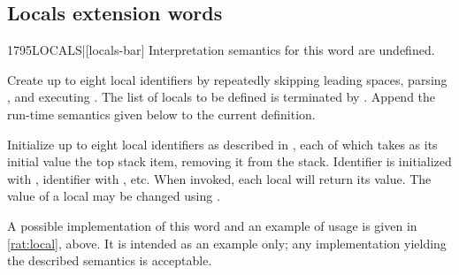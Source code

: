 \subsection{Locals extension words} %
\extended

\begin{worddef}[LOCALS]{1795}{LOCALS|}[locals-bar]
\interpret
	Interpretation semantics for this word are undefined.

\compile

	Create up to eight local identifiers by repeatedly skipping
	leading spaces, parsing , and executing
	. The list of locals to be defined
	is terminated by \param{|}. Append the run-time semantics given
	below to the current definition.

\runtime

	Initialize up to eight local identifiers as described in
	, each of which takes as its
	initial value the top stack item, removing it from the stack.
	Identifier  is initialized with ,
	identifier  with , etc. When invoked,
	each local will return its value. The value of a local may be
	changed using .

	\begin{defer}
	\rationale %
		A possible implementation of this word and an example of usage
		is given in \ref{rat:local}, above. It is intended as an
		example only; any implementation yielding the described
		semantics is acceptable.
	\end{defer}
\end{worddef}
